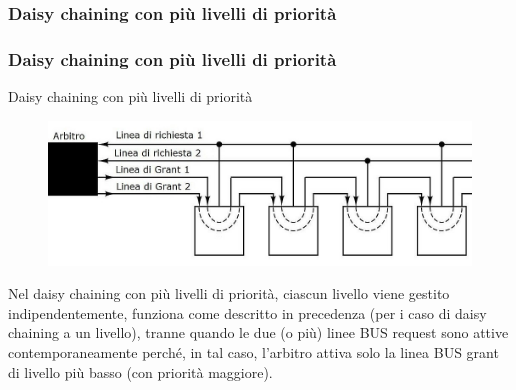 \subsubsection[Daisy chaining con più livelli di priorità]{Daisy chaining con più livelli di priorità}
\begin{frame}
	\frametitle{Daisy chaining con più livelli di priorità}
	
	\begin{block}{Daisy chaining con più livelli di priorità}
		\begin{figure}[!htbp]
			\centering
			\includegraphics[width=0.8\linewidth]{images/6_bus/daisy_chaining_lev_n.jpg}
		\end{figure}
		\begin{footnotesize}
		Nel daisy chaining con più livelli di priorità, ciascun livello viene gestito  indipendentemente, funziona come descritto in precedenza (per i caso di daisy chaining a un livello), tranne quando le due (o più) linee BUS request sono attive contemporaneamente perché, in tal caso, l’arbitro attiva solo la linea BUS grant di livello più basso (con priorità maggiore).
		\end{footnotesize}
	\end{block}
\end{frame}



